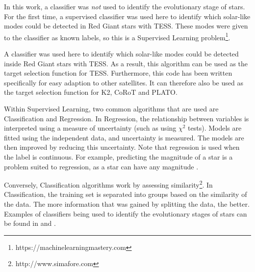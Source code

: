 \documentclass[a4paper,fleqn,usenatbib,useAMS]{mnras}
\newcommand{\pdet}{\ensuremath{P_{\rm det}\:}}
\begin{document}
In this work, a classifier was \textit{not} used to identify the evolutionary stage of stars. For the first time, a supervised classifier was used here to identify which solar-like modes could be detected in Red Giant stars with TESS. These modes were given to the classifier as known labels, so this is a Supervised Learning problem\footnote{https://machinelearningmastery.com}.

A classifier was used here to identify which solar-like modes could be detected inside Red Giant stars with TESS. As a result, this algorithm can be used as the target selection function for TESS. Furthermore, this code has been written specifically for easy adaption to other satellites. It can therefore also be used as the target selection function for K2, CoRoT and PLATO.


Within Supervised Learning, two common algorithms that are used are Classification and Regression. In Regression, the relationship between variables is interpreted using a measure of uncertainty (such as using $\chi^{2}$ tests). Models are fitted using the independent data, and uncertainty is measured. The models are then improved by reducing this uncertainty. Note that regression is used when the label is continuous. For example, predicting the magnitude of a star is a problem suited to regression, as a star can have any magnitude \citep{steinhardt_nonparametric_2018}.

Conversely, Classification algorithms work by assessing similarity\footnote{http://www.simafore.com}. In Classification, the training set is separated into groups based on the similarity of the data. The more information that was gained by splitting the data, the better. %
Examples of classifiers being used to identify the evolutionary stages of stars can be found in \citet{ness_cannon_2015} and \citet{wu_mass_2017}.
\end{document}
